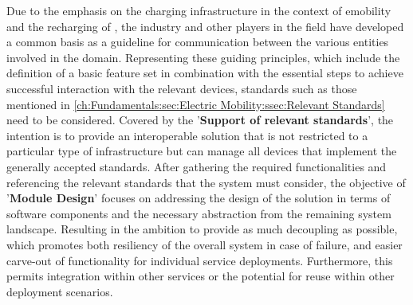 Due to the emphasis on the charging infrastructure in the context of \acrshort{emobility} and the recharging of , the industry and other players in the field have developed a common basis as a guideline for communication between the various entities involved in the domain.
Representing these guiding principles, which include the definition of a basic feature set in combination with the essential steps to achieve successful interaction with the relevant devices, standards such as those mentioned in \ref{ch:Fundamentals:sec:Electric Mobility:ssec:Relevant Standards} need to be considered.
Covered by the '\textbf{Support of relevant standards}', the intention is to provide an interoperable solution that is not restricted to a particular type of infrastructure but can manage all devices that implement the generally accepted standards.
After gathering the required functionalities and referencing the relevant standards that the system must consider, the objective of '\textbf{Module Design}' focuses on addressing the design of the solution in terms of software components and the necessary abstraction from the remaining system landscape.
Resulting in the ambition to provide as much decoupling as possible, which promotes both resiliency of the overall system in case of failure, and easier carve-out of functionality for individual service deployments. Furthermore, this permits integration within other services or the potential for reuse within other deployment scenarios. \\

